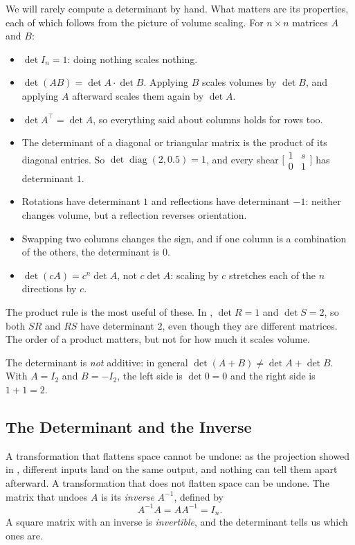 We will rarely compute a determinant by hand. What matters are its
properties, each of which follows from the picture of volume scaling.
For $n \times n$ matrices $A$ and $B$:
\begin{itemize}
  \item $\det I_n = 1$: doing nothing scales nothing.
  \item $\det(AB) = \det A \cdot \det B$. Applying $B$ scales volumes by
    $\det B$, and applying $A$ afterward scales them again by $\det A$.
  \item $\det A^\top = \det A$, so everything said about columns holds
    for rows too.
  \item The determinant of a diagonal or triangular matrix is the product
    of its diagonal entries. So $\det \operatorname{diag}(2, 0.5) = 1$,
    and every shear $\bigl[\begin{smallmatrix} 1 & s \\ 0 & 1
    \end{smallmatrix}\bigr]$ has determinant $1$.
  \item Rotations have determinant $1$ and reflections have determinant
    $-1$: neither changes volume, but a reflection reverses orientation.
  \item Swapping two columns changes the sign, and if one column is a
    combination of the others, the determinant is $0$.
  \item $\det(cA) = c^n \det A$, not $c \det A$: scaling by $c$ stretches
    each of the $n$ directions by $c$.
\end{itemize}

The product rule is the most useful of these. In
, $\det R = 1$ and $\det S = 2$, so both $SR$ and
$RS$ have determinant $2$, even though they are different matrices. The
order of a product matters, but not for how much it scales volume.

\begin{warning}
  The determinant is \emph{not} additive: in general
  $\det(A + B) \ne \det A + \det B$. With $A = I_2$ and $B = -I_2$, the
  left side is $\det 0 = 0$ and the right side is $1 + 1 = 2$.
\end{warning}

\subsection{The Determinant and the Inverse}
\label{sec:ch03-det-inverse}

A transformation that flattens space cannot be undone: as the projection
showed in , different inputs land on the
same output, and nothing can tell them apart afterward. A transformation
that does not flatten space can be undone. The matrix that undoes $A$ is
its \emph{inverse} $A^{-1}$, defined by
\[
  A^{-1} A = A A^{-1} = I_n .
\]
A square matrix with an inverse is \emph{invertible}, and the
determinant tells us which ones are.

